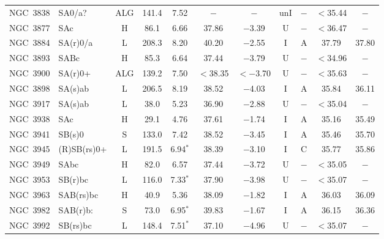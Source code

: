 \begin{center}
\begin{longtable}{lC{2.5cm}ccccccccc}
NGC~3838   & SA0/a?      & ALG         & 141.4 & 7.52            & $-$      & $-$           & unI &$-$       & $<$35.44 &   $-$       \\
NGC~3877  & SAc           &  H            &   86.1   & 6.66          &   37.86  & $-$3.39   &  U &   $-$      & $<$36.47 & $-$ \\
NGC~3884   & SA(r)0/a      & L                & 208.3 & 8.20            & 40.20    & $-$2.55       & I   & A        & 37.79    & 37.80    \\
NGC~3893  & SABc        &  H             &    85.3     &  6.64        &   37.44    & $-$3.79     &   U &  $-$      & $<$34.96 & $-$  \\
NGC~3900   & SA(r)0+    & ALG              & 139.2 & 7.50            & $<$38.35  & $<-$3.70   & U   &$-$       & $<$35.63 & $-$       \\
NGC~3898   & SA(s)ab   & L         & 206.5 & 8.19            & 38.52    & $-$4.03      & I   & A         & 35.84    &  36.11       \\
NGC~3917   & SA(s)ab  & L                & 38.0    & 5.23             & 36.90    & $-$2.88      & U   &$-$        & $<$35.04 & $-$      \\
NGC~3938  & SAc        &   H            &   29.1    &  4.76        &   37.61    & $-$1.74     &  I & A   &    35.16   &  35.49   \\
NGC~3941   & SB(s)0    & S           & 133.0   & 7.42            & 38.52    & $-$3.45  & I   & A         & 35.46    & 35.70   \\
NGC~3945   & (R)SB(rs)0+  & L                & 191.5 & 6.94$^{*}$       & 38.39    & $-$3.10       & I   & C         &  35.77  & 35.86    \\
NGC~3949  &  SAbc       &  H         & 82.0    &  6.57   &     37.44    & $-$3.72      &    U &  $-$      & $<$35.05 & $-$  \\
NGC~3953   & SB(r)bc        & L                & 116.0   & 7.33$^{*}$       & 37.90    & $-$3.98    & U   &$-$       & $<$35.07 & $-$      \\
NGC~3963   & SAB(rs)bc  & H                & 40.9  & 5.36             & 38.09    & $-$1.82     & I   & A         &  36.03  &  36.09       \\
NGC~3982   & SAB(r)b:   & S                & 73.0    & 6.95$^{*}$       & 39.83    & $-$1.67      & I   & A        &  36.15  &  36.36       \\
NGC~3992   & SB(rs)bc    &  L       & 148.4 & 7.51$^{*}$      & 37.10 & $-$4.96      & U   &$-$        & $<$35.07 & $-$     \\

\end{longtable}
\end{center}
